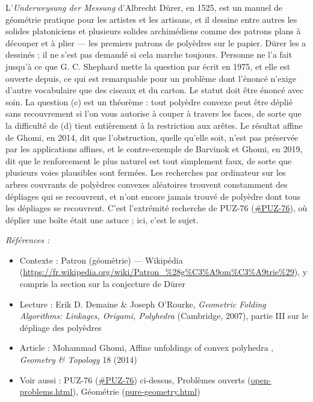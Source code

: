 \documentclass[11pt]{article}
\newenvironment{refs}{\par\small\noindent\emph{Références :}\begin{itemize}\setlength\itemsep{0pt}}{\end{itemize}\normalsize}
\begin{document}
\noindent L'\textit{Underweysung der Messung} d'Albrecht Dürer, en 1525, est un manuel
de géométrie pratique pour les artistes et les artisans, et il dessine entre autres les solides
platoniciens et plusieurs solides archimédiens comme des patrons plans à découper et à plier ---
les premiers patrons de polyèdres sur le papier. Dürer les a dessinés ; il ne s'est pas demandé
si cela marche toujours. Personne ne l'a fait jusqu'à ce que G. C. Shephard mette la question
par écrit en 1975, et elle est ouverte depuis, ce qui est remarquable pour un problème dont
l'énoncé n'exige d'autre vocabulaire que des ciseaux et du carton. Le statut doit être énoncé
avec soin. La question (c) est un théorème : tout polyèdre convexe peut être déplié sans
recouvrement si l'on vous autorise à couper à travers les faces, de sorte que la difficulté de
(d) tient entièrement à la restriction aux arêtes. Le résultat affine de Ghomi, en 2014, dit
que l'obstruction, quelle qu'elle soit, n'est pas préservée par les applications affines, et le
contre-exemple de Barvinok et Ghomi, en 2019, dit que le renforcement le plus naturel est tout
simplement faux, de sorte que plusieurs voies plausibles sont fermées. Les recherches par
ordinateur sur les arbres couvrants de polyèdres convexes aléatoires trouvent constamment des
dépliages qui se recouvrent, et n'ont encore jamais trouvé de polyèdre dont tous les dépliages
se recouvrent. C'est l'extrémité \og{} recherche \fg{} de PUZ-76 (\url{#PUZ-76}), où déplier une
boîte était une astuce ; ici, c'est le sujet.

\begin{refs}
\item Contexte : Patron (géométrie) --- Wikipédia (\url{https://fr.wikipedia.org/wiki/Patron_%28g%C3%A9om%C3%A9trie%29}), y compris la section sur la conjecture de Dürer
\item Lecture : Erik D. Demaine \& Joseph O'Rourke, \textit{Geometric Folding Algorithms: Linkages, Origami, Polyhedra} (Cambridge, 2007), partie III sur le dépliage des polyèdres
\item Article : Mohammad Ghomi, \og{} Affine unfoldings of convex polyhedra \fg{}, \textit{Geometry \& Topology} 18 (2014)
\item Voir aussi : PUZ-76 (\url{#PUZ-76}) ci-dessus, Problèmes ouverts (\url{open-problems.html}), Géométrie (\url{pure-geometry.html})
\end{refs}

\bigskip
\end{document}
